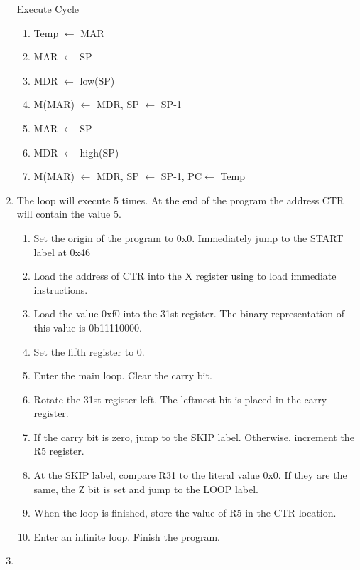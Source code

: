 \documentclass[12pt,letterpaper]{article}
\begin{document}
\begin{enumerate}
    Execute Cycle
    \begin{enumerate}[i]
        \item Temp $\leftarrow$ MAR
        \item MAR $\leftarrow$ SP
        \item MDR $\leftarrow$ low(SP)
        \item M(MAR) $\leftarrow$ MDR, SP $\leftarrow$ SP-1
        \item MAR $\leftarrow$ SP
        \item MDR $\leftarrow$ high(SP)
        \item M(MAR) $\leftarrow$ MDR, SP $\leftarrow$ SP-1, PC$\leftarrow$ Temp
    \end{enumerate}
    \item The loop will execute 5 times. At the end of the program the address
    CTR will contain the value 5.

    \begin{enumerate}[i]
    \item Set the origin of the program to 0x0. Immediately jump to the START
    label at 0x46
    \item Load the address of CTR into the X register using to load immediate
    instructions.
    \item Load the value 0xf0 into the 31st register. The binary representation
    of this value is 0b11110000.
    \item Set the fifth register to 0.
    \item Enter the main loop. Clear the carry bit.
    \item Rotate the 31st register left. The leftmost bit is placed in the
    carry register.
    \item If the carry bit is zero, jump to the SKIP label. Otherwise,
    increment the R5 register.
    \item At the SKIP label, compare R31 to the literal value 0x0. If they are
    the same, the Z bit is set and jump to the LOOP label.
    \item When the loop is finished, store the value of R5 in the CTR location.
    \item Enter an infinite loop. Finish the program.

    \end{enumerate}

    \item 
\end{enumerate}
\end{document}
